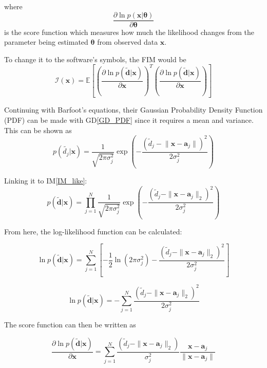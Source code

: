 \documentclass[12pt]{article}
\newcommand{\dref}[1]{GD\ref{#1}}
\newcommand{\iref}[1]{IM\ref{#1}}
\begin{document}
where\\ 
\[\frac{\partial \ln p(\mathbf{x} | \boldsymbol{\theta})}{\partial \boldsymbol{\theta}}\] is the score function which measures how much the likelihood changes from the parameter being estimated $\boldsymbol{\theta}$ from observed data $\mathbf{x}$.

To change it to the software's symbols, the FIM would be
\begin{displaymath}
  \boldsymbol{\mathcal{I}}(\mathbf{x}) = \mathbb{E} \left[
  \left( \frac{\partial \ln p(\mathbf{\tilde{d}} | \mathbf{x})}{\partial \mathbf{x}} \right)^{T}
  \left( \frac{\partial \ln p(\mathbf{\tilde{d}} | \mathbf{x})}{\partial \mathbf{x}} \right)
  \right]
\end{displaymath} 

Continuing with Barfoot's equations, their Gaussian Probability Density Function (PDF) can be made with \dref{GD_PDF} since it requires a mean and variance. This can be shown as
\begin{displaymath}
  p(\tilde{d_j} | \mathbf{x}) = \frac{1}{\sqrt{2\pi\sigma_j^2}} 
  \exp \left( 
  -\frac{(\tilde{d}_j - \lVert\mathbf{x} - \mathbf{a}_j\rVert)^2}{2\sigma_j^2} 
  \right)
\end{displaymath}

Linking it to \iref{IM_like}:
\begin{displaymath}
  p(\tilde{\mathbf{d}} | \mathbf{x}) = \prod_{j=1}^{N} 
  \frac{1}{\sqrt{2\pi\sigma_j^2}} 
  \exp \left( 
  -\frac{(\tilde{d}_j - \|\mathbf{x} - \mathbf{a}_j\|_2)^2}{2\sigma_j^2} 
  \right)
\end{displaymath}

From here, the log-likelihood function can be calculated:

\begin{displaymath}
  \ln p(\tilde{\mathbf{d}} | \mathbf{x}) = \sum_{j=1}^{N} 
  \left[ -\frac{1}{2} \ln (2\pi\sigma_j^2) 
  - \frac{(\tilde{d}_j - \|\mathbf{x} - \mathbf{a}_j\|_2)^2}{2\sigma_j^2} 
  \right]
\end{displaymath}

\begin{displaymath}
  \ln p(\tilde{\mathbf{d}} | \mathbf{x}) = -\sum_{j=1}^{N} 
  \frac{(\tilde{d}_j - \|\mathbf{x} - \mathbf{a}_j\|_2)^2}{2\sigma_j^2}
\end{displaymath}

The score function can then be written as

\begin{displaymath}
  \frac{\partial \ln p(\tilde{\mathbf{d}} | \mathbf{x})}{\partial \mathbf{x}} = \sum_{j=1}^{N} 
  \frac{(\tilde{d}_j - \|\mathbf{x} - \mathbf{a}_j\|_2)}{\sigma_j^2}
  \frac{\mathbf{x} - \mathbf{a}_j}{\|\mathbf{x} - \mathbf{a}_j\|}
\end{displaymath}
\end{document}
